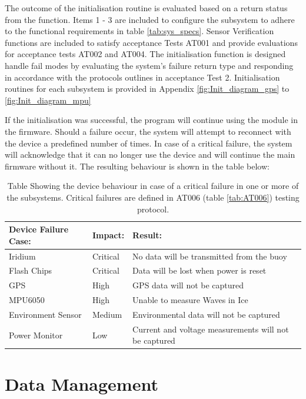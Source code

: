 The outcome of the initialisation routine is evaluated based on a return status from the function. Items 1 - 3 are included to configure the subsystem to adhere to the functional requirements in table \ref{tab:sys_specs}. Sensor Verification functions are included to satisfy acceptance Tests AT001 and provide evaluations for acceptance tests AT002 and AT004. The initialisation function is designed handle fail modes by evaluating the system's failure return type and responding in accordance with the protocols outlines in acceptance Test 2. Initialisation routines for each subsystem is provided in Appendix \ref{fig:Init_diagram_gps} to \ref{fig:Init_diagram_mpu}

If the initialisation was successful, the program will continue using the module in the firmware. Should a failure occur, the system will attempt to reconnect with the device a predefined number of times. In case of a critical failure, the system will acknowledge that it can no longer use the device and will continue the main firmware without it. The resulting behaviour is shown in the table below:

\begin{table}[H]
	\centering
	\caption{Table Showing the device behaviour in case of a critical failure in one or more of the subsystems. Critical failures are defined in AT006 (table \ref{tab:AT006}) testing protocol.}
	\begin{tabular}{|l|l|l|}
		\hline
		\textbf{Device Failure Case:}  & \textbf{Impact:} & \textbf{Result:}\\
		\hline
		Iridium & Critical & No data will be transmitted from the buoy \\
		\hline
		Flash Chips & Critical & Data will be lost when power is reset \\
		\hline
		GPS & High & GPS data will not be captured \\
		\hline
		MPU6050 & High & Unable to measure Waves in Ice  \\
		\hline
		Environment Sensor & Medium & Environmental data will not be captured \\
		\hline
		Power Monitor & Low & Current and voltage measurements will not be captured \\
		\hline
	\end{tabular}
	\label{tab:exe_subsy_Failiure}
\end{table}
\section{Data Management}

